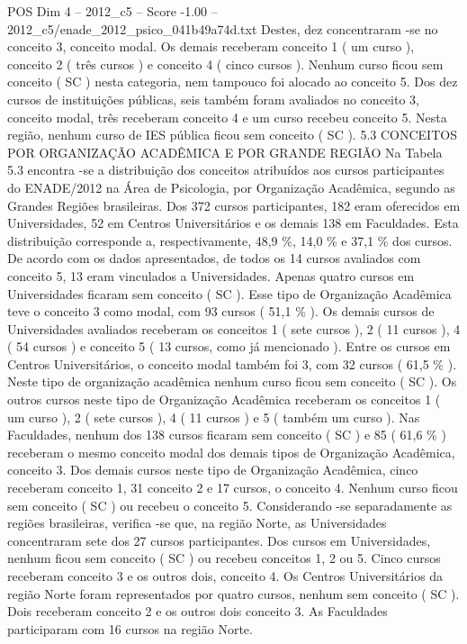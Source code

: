 \begin{textsample}{POS Dim 4 – 2012\_c5 – Score -1.00 – 2012\_c5/enade\_2012\_psico\_041b49a74d.txt}
Destes, dez concentraram -se no conceito 3, conceito modal.
Os demais receberam conceito 1 ( um curso ), conceito 2 ( três cursos ) e conceito 4 ( cinco cursos ).
Nenhum curso ficou sem conceito ( SC ) nesta categoria, nem tampouco foi alocado ao conceito 5.
Dos dez cursos de instituições públicas, seis também foram avaliados no conceito 3, conceito modal, três receberam conceito 4 e um curso recebeu conceito 5.
Nesta região, nenhum curso de IES pública ficou sem conceito ( SC ). 5.3 CONCEITOS POR ORGANIZAÇÃO ACADÊMICA E POR GRANDE REGIÃO Na Tabela 5.3 encontra -se a distribuição dos conceitos atribuídos aos cursos participantes do ENADE/2012 na Área de Psicologia, por Organização Acadêmica, segundo as Grandes Regiões brasileiras.
Dos 372 cursos participantes, 182 eram oferecidos em Universidades, 52 em Centros Universitários e os demais 138 em Faculdades.
Esta distribuição corresponde a, respectivamente, 48,9 \%, 14,0 \% e 37,1 \% dos cursos.
De acordo com os dados apresentados, de todos os 14 cursos avaliados com conceito 5, 13 eram vinculados a Universidades.
Apenas quatro cursos em Universidades ficaram sem conceito ( SC ).
Esse tipo de Organização Acadêmica teve o conceito 3 como modal, com 93 cursos ( 51,1 \% ).
Os demais cursos de Universidades avaliados receberam os conceitos 1 ( sete cursos ), 2 ( 11 cursos ), 4 ( 54 cursos ) e conceito 5 ( 13 cursos, como já mencionado ).
Entre os cursos em Centros Universitários, o conceito modal também foi 3, com 32 cursos ( 61,5 \% ).
Neste tipo de organização acadêmica nenhum curso ficou sem conceito ( SC ).
Os outros cursos neste tipo de Organização Acadêmica receberam os conceitos 1 ( um curso ), 2 ( sete cursos ), 4 ( 11 cursos ) e 5 ( também um curso ).
Nas Faculdades, nenhum dos 138 cursos ficaram sem conceito ( SC ) e 85 ( 61,6 \% ) receberam o mesmo conceito modal dos demais tipos de Organização Acadêmica, conceito 3.
Dos demais cursos neste tipo de Organização Acadêmica, cinco receberam conceito 1, 31 conceito 2 e 17 cursos, o conceito 4.
Nenhum curso ficou sem conceito ( SC ) ou recebeu o conceito 5.
Considerando -se separadamente as regiões brasileiras, verifica -se que, na região Norte, as Universidades concentraram sete dos 27 cursos participantes.
Dos cursos em Universidades, nenhum ficou sem conceito ( SC ) ou recebeu conceitos 1, 2 ou 5.
Cinco cursos receberam conceito 3 e os outros dois, conceito 4.
Os Centros Universitários da região Norte foram representados por quatro cursos, nenhum sem conceito ( SC ).
Dois receberam conceito 2 e os outros dois conceito 3.
As Faculdades participaram com 16 cursos na região Norte.

\end{textsample}
